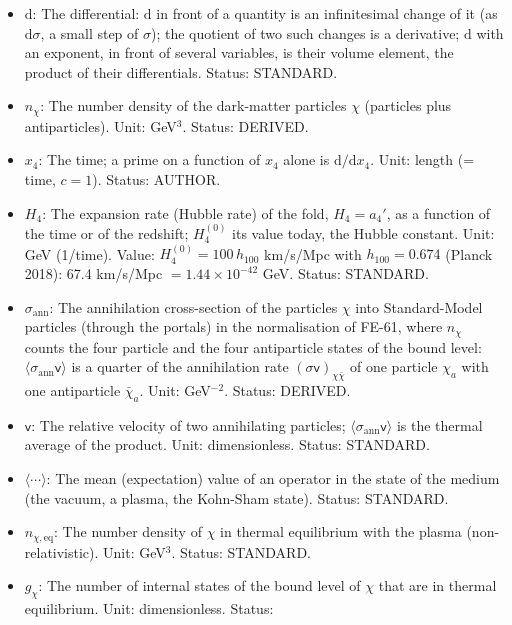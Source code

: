 \documentclass[
  10pt,
]{article}
\providecommand{\tightlist}{%
  \setlength{\itemsep}{0pt}\setlength{\parskip}{0pt}}
\begin{document}
\begin{itemize}
\tightlist
\item
  \(\mathrm{d}\): The differential: \(\mathrm{d}\) in front of a
  quantity is an infinitesimal change of it (as \(\mathrm{d}\sigma\), a
  small step of \(\sigma\)); the quotient of two such changes is a
  derivative; \(\mathrm{d}\) with an exponent, in front of several
  variables, is their volume element, the product of their
  differentials. Status: STANDARD.
\item
  \(n_\chi\): The number density of the dark-matter particles \(\chi\)
  (particles plus antiparticles). Unit: GeV\(^3\). Status: DERIVED.
\item
  \(x_4\): The time; a prime on a function of \(x_4\) alone is
  \(\mathrm{d}/\mathrm{d}x_4\). Unit: length (= time, \(c = 1\)).
  Status: AUTHOR.
\item
  \(H_4\): The expansion rate (Hubble rate) of the fold, \(H_4 = a_4'\),
  as a function of the time or of the redshift; \(H_4^{(0)}\) its value
  today, the Hubble constant. Unit: GeV (1/time). Value:
  \(H_4^{(0)} = 100\,h_{100}\) km/s/Mpc with \(h_{100} = 0.674\) (Planck
  2018): 67.4 km/s/Mpc \(= 1.44\times10^{-42}\) GeV. Status: STANDARD.
\item
  \(\sigma_{\mathrm{ann}}\): The annihilation cross-section of the
  particles \(\chi\) into Standard-Model particles (through the portals)
  in the normalisation of FE-61, where \(n_\chi\) counts the four
  particle and the four antiparticle states of the bound level:
  \(\langle\sigma_{\mathrm{ann}}\mathsf{v}\rangle\) is a quarter of the
  annihilation rate \((\sigma\mathsf{v})_{\chi\bar\chi}\) of one
  particle \(\chi_a\) with one antiparticle \(\bar\chi_a\). Unit:
  GeV\(^{-2}\). Status: DERIVED.
\item
  \(\mathsf{v}\): The relative velocity of two annihilating particles;
  \(\langle\sigma_{\mathrm{ann}}\mathsf{v}\rangle\) is the thermal
  average of the product. Unit: dimensionless. Status: STANDARD.
\item
  \(\langle\cdots\rangle\): The mean (expectation) value of an operator
  in the state of the medium (the vacuum, a plasma, the Kohn-Sham
  state). Status: STANDARD.
\item
  \(n_{\chi,\mathrm{eq}}\): The number density of \(\chi\) in thermal
  equilibrium with the plasma (non-relativistic). Unit: GeV\(^3\).
  Status: STANDARD.
\item
  \(g_\chi\): The number of internal states of the bound level of
  \(\chi\) that are in thermal equilibrium. Unit: dimensionless. Status:

\end{itemize}
\end{document}
